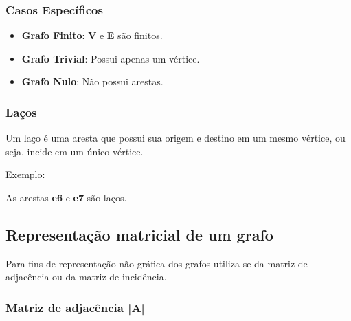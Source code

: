 \documentclass[a4paper, 12pt]{article}
\begin{document}
\subsubsection{Casos Específicos}

\begin{itemize}
	\item\textbf{Grafo Finito}:  \textbf{V} e \textbf{E} são finitos.
	\item\textbf{Grafo Trivial}: Possui apenas um vértice.
	\item\textbf{Grafo Nulo}: Não possui arestas.
\end{itemize}

\subsubsection{Laços}
    Um laço é uma aresta que possui sua origem e destino em um mesmo vértice, ou seja, incide em um único vértice.
    
    \vspace{0.5in}
    
    Exemplo:
    
    \begin{center}
    \end{center}
    
    As arestas \textbf{e6} e \textbf{e7} são laços.

        
\subsection{Representação matricial de um grafo}

    Para fins de representação não-gráfica dos grafos utiliza-se da matriz de adjacência ou da matriz de incidência.
    
\subsubsection{Matriz de adjacência |A|}
\end{document}
